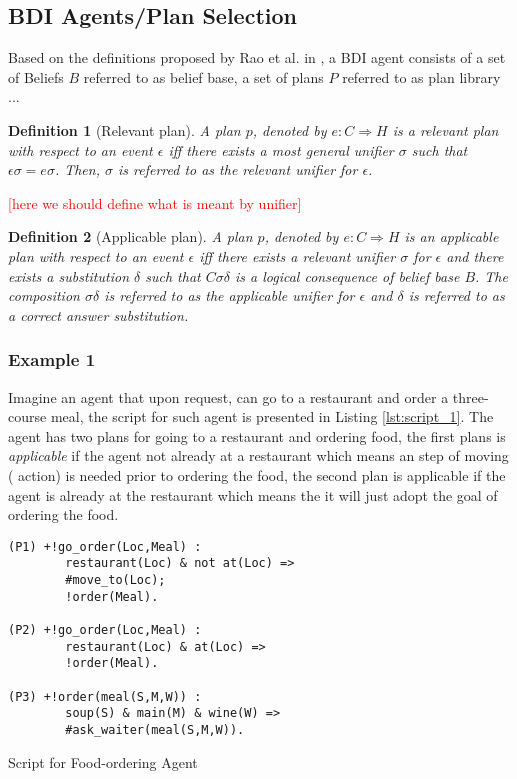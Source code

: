 \documentclass[sigconf,anonymous]{aamas}
\newcommand{\Gio}[1]{\textcolor{red}{#1}}
\newtheorem{definition}{Definition}
\begin{document}
\subsection{BDI Agents/Plan Selection}
Based on the definitions proposed by Rao et al. in \cite{Rao1995,RaoAS1996}, a BDI agent consists of a set of Beliefs $B$ referred to as belief base, a set of plans $P$ referred to as plan library ... 
\begin{definition}
[Relevant plan] A plan $p$, denoted by $e : C \Rightarrow H$ is a \textit{relevant plan} with respect to an event $\epsilon$ iff there exists a most general unifier $\sigma$ such that $\epsilon\sigma = e\sigma$. Then, $\sigma$ is referred to as the relevant unifier for $\epsilon$.
\end{definition}
\Gio{[here we should define what is meant by unifier]}
\begin{definition}
[Applicable plan] A plan $p$, denoted by $e : C \Rightarrow H$ is an \textit{applicable plan} with respect to an event $\epsilon$ iff there exists a relevant unifier $\sigma$ for $\epsilon$ and there exists a substitution $\delta$ such that $C\sigma\delta$
is a logical consequence of belief base $B$. The composition $\sigma\delta$ is referred to as the applicable unifier for $\epsilon$ and $\delta$ is referred to as a \textit{correct answer substitution}.
\end{definition}

\subsubsection*{Example 1}
Imagine an agent that upon request, can go to a restaurant and order a three-course meal, the script for such agent is presented in Listing \ref{lst:script_1}. The agent has two plans for going to a restaurant and ordering food, the first plans is \textit{applicable} if the agent not already at a restaurant which means an step of moving ( action) is needed prior to ordering the food, the second plan is applicable if the agent is already at the restaurant which means the it will just adopt the goal of ordering the food.

\begin{listing}[!h]
\centering
\begin{verbatim}
(P1) +!go_order(Loc,Meal) :
        restaurant(Loc) & not at(Loc) =>
        #move_to(Loc);
        !order(Meal).

(P2) +!go_order(Loc,Meal) :
        restaurant(Loc) & at(Loc) => 
        !order(Meal). 

(P3) +!order(meal(S,M,W)) : 
        soup(S) & main(M) & wine(W) => 
        #ask_waiter(meal(S,M,W)).
\end{verbatim}
    \caption{Script for Food-ordering Agent}
    \label{lst:script_1}
\end{listing}
\end{document}
